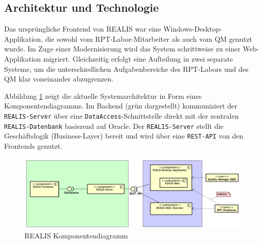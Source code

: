 \subsection{Architektur und Technologie}
Das ursprüngliche Frontend von REALIS war eine Windows-Desktop-Applikation, die sowohl vom \gls{RPT}-Labor-Mitarbeiter als auch vom \gls{QM} genutzt wurde. Im Zuge einer Modernisierung wird das System schrittweise zu einer Web-Applikation migriert. Gleichzeitig erfolgt eine Aufteilung in zwei separate Systeme, um die unterschiedlichen Aufgabenbereiche des RPT-Labors und des \gls{QM} klar voneinander abzugrenzen.

Abbildung \ref{fig:realis-komponentendiagramm} zeigt die aktuelle Systemarchitektur in Form eines Komponentendiagramms. Im Backend (grün dargestellt) kommuniziert der \texttt{REALIS-Server} über eine \texttt{DataAccess}-Schnittstelle direkt mit der zentralen \texttt{REALIS-Datenbank} basierend auf Oracle. Der \texttt{REALIS-Server} stellt die Geschäftslogik (Business-Layer) bereit und wird über eine \texttt{REST-API} von den Frontends genutzt.

\begin{figure}[!h]
    \centering
    \includegraphics[width=1\textwidth]{bilder/REALIS-Komponentendiagramm.png}
    \caption{REALIS Komponentendiagramm}
    \label{fig:realis-komponentendiagramm}
\end{figure}

